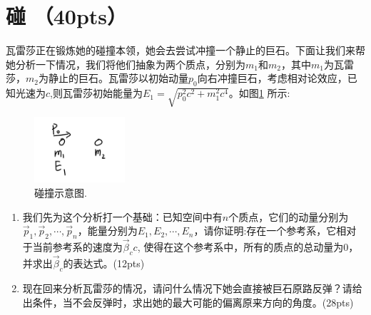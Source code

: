 \section{碰 （40pts）}
瓦雷莎正在锻炼她的碰撞本领，她会去尝试冲撞一个静止的巨石。下面让我们来帮她分析一下情况，我们将他们抽象为两个质点，分别为\(m_1\)和\(m_2\)，其中\(m_1\)为瓦雷莎，\(m_2\)为静止的巨石。瓦雷莎以初始动量\(p_0\)向右冲撞巨石，考虑相对论效应，已知光速为\(c\),则瓦雷莎初始能量为\(E_1 = \sqrt{p_0^2c^2 + m_1^2c^4}\)。如图\ref{peng1} 所示:
\begin{figure}[htbp]
	\centering
	\includegraphics[width=0.3\textwidth]{peng1}
	\caption{碰撞示意图.}
	\label{peng1}
\end{figure}
\begin{enumerate}
	\item 我们先为这个分析打一个基础：已知空间中有\(n\)个质点，它们的动量分别为\(\vec{p}_1,\vec{p}_2,\cdots,\vec{p}_n\)，能量分别为\(E_1,E_2,\cdots,E_n\)，请你证明:存在一个参考系，它相对于当前参考系的速度为\(\vec{\beta}_c c\), 使得在这个参考系中，所有的质点的总动量为0，并求出\(\vec{\beta}_c\)的表达式。(12pts)
	\item 现在回来分析瓦雷莎的情况，请问什么情况下她会直接被巨石原路反弹？请给出条件，当不会反弹时，求出她的最大可能的偏离原来方向的角度。(28pts)
\end{enumerate}